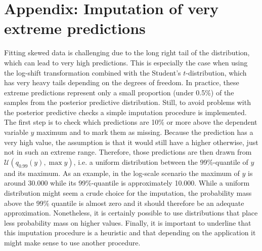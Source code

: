 \chapter{Appendix: Imputation of very extreme predictions}
\label{ch:imputation}
Fitting skewed data is challenging due to the long right tail of the distribution, which can lead to very high predictions.
This is especially the case when using the log-shift transformation combined with the Student's $t$-distribution, which has very heavy tails depending on the degrees of freedom.
In practice, these extreme predictions represent only a small proportion (under 0.5\%) of the samples from the posterior predictive distribution.
Still, to avoid problems with the posterior predictive checks a simple imputation procedure is implemented.
The first step is to check which predictions are 10\% or more above the dependent variable $y$ maximum and to mark them as missing.
Because the prediction has a very high value, the assumption is that it would still have a higher otherwise, just not in such an extreme range.
Therefore, those predictions are then drawn from $\mathcal U(q_{0.99}(y), \max y)$, i.e. a uniform distribution between the 99\%-quantile of $y$ and its maximum.
As an example, in the log-scale scenario the maximum of $y$ is around 30.000 while its 99\%-quantile is approximately 10.000.
While a uniform distribution might seem a crude choice for the imputation, the probability mass above the 99\% quantile is almost zero and it should therefore be an adequate approximation.
Nonetheless, it is certainly possible to use distributions that place less probability mass on higher values.
Finally, it is important to underline that this imputation procedure is a heuristic and that depending on the application it might make sense to use another procedure.